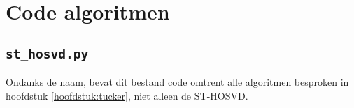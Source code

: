 \chapter{Code algoritmen}
\label{app:algoritmen}

\section{\texttt{st\_hosvd.py}}

Ondanks de naam, bevat dit bestand code omtrent alle algoritmen besproken in hoofdstuk \ref{hoofdstuk:tucker}, niet alleen de ST-HOSVD.\\

